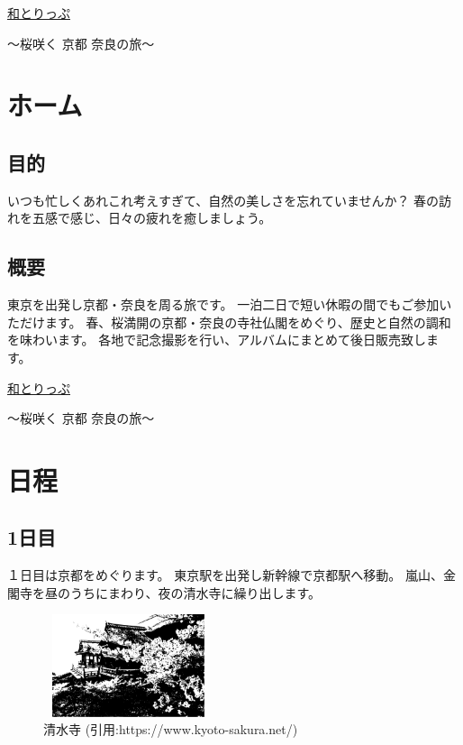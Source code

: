 \documentclass[12pt]{jarticle}
\begin{document}
\begin{center}
    {\Huge \underline{和とりっぷ}}

    〜桜咲く 京都 奈良の旅〜
\end{center}
\section{ホーム}
\subsection{目的}
いつも忙しくあれこれ考えすぎて、自然の美しさを忘れていませんか？
春の訪れを五感で感じ、日々の疲れを癒しましょう。
\subsection{概要}

東京を出発し京都・奈良を周る旅です。
一泊二日で短い休暇の間でもご参加いただけます。
春、桜満開の京都・奈良の寺社仏閣をめぐり、歴史と自然の調和を味わいます。
各地で記念撮影を行い、アルバムにまとめて後日販売致します。

\clearpage
\begin{center}
    {\Huge \underline{和とりっぷ}}

    〜桜咲く 京都 奈良の旅〜
\end{center}
\section{日程}
\subsection{1日目}
１日目は京都をめぐります。
東京駅を出発し新幹線で京都駅へ移動。
嵐山、金閣寺を昼のうちにまわり、夜の清水寺に繰り出します。
\begin{figure}[h]
    \begin{center}
        \includegraphics[height=3cm, width=5cm]{kiyomizu.eps}
    \end{center}
\caption{清水寺 (引用:https://www.kyoto-sakura.net/)}
\end{figure}
\end{document}
